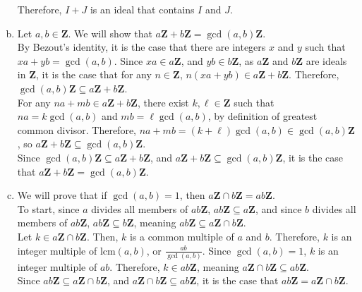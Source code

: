 \documentclass[10pt]{extarticle}
\begin{document}
\begin{enumerate}[(a)]
      Therefore, $I+J$ is an ideal that contains $I$ and $J$.
    \item Let $a,b\in\mathbf{Z}$. We will show that $a\mathbf{Z} + b\mathbf{Z} = \gcd(a,b)\mathbf{Z}$.\\

      By Bezout's identity, it is the case that there are integers $x$ and $y$ such that $xa + yb = \gcd(a,b)$. Since $xa\in a\mathbf{Z}$, and $yb\in b\mathbf{Z}$, as $a\mathbf{Z}$ and $b\mathbf{Z}$ are ideals in $\mathbf{Z}$, it is the case that for any $n\in\mathbf{Z}$, $n(xa + yb) \in a\mathbf{Z} + b\mathbf{Z}$. Therefore, $\gcd(a,b)\mathbf{Z}\subseteq a\mathbf{Z} + b\mathbf{Z}$.\\

      For any $na + mb\in a\mathbf{Z} + b\mathbf{Z}$, there exist $k,\ell\in \mathbf{Z}$ such that $na = k\gcd(a,b)$ and $mb = \ell\gcd(a,b)$, by definition of greatest common divisor. Therefore, $na + mb = (k+\ell)\gcd(a,b)\in \gcd(a,b)\mathbf{Z}$, so $a\mathbf{Z}+b\mathbf{Z}\subseteq \gcd(a,b)\mathbf{Z}$.\\

      Since $\gcd(a,b)\mathbf{Z}\subseteq a\mathbf{Z} + b\mathbf{Z}$, and $a\mathbf{Z} + b\mathbf{Z}\subseteq \gcd(a,b)\mathbf{Z}$, it is the case that $a\mathbf{Z} + b\mathbf{Z} = \gcd(a,b)\mathbf{Z}$.
    \item We will prove that if $\gcd(a,b) = 1$, then $a\mathbf{Z}\cap b\mathbf{Z} = ab\mathbf{Z}$.\\

      To start, since $a$ divides all members of $ab\mathbf{Z}$, $ab\mathbf{Z}\subseteq a\mathbf{Z}$, and since $b$ divides all members of $ab\mathbf{Z}$, $ab\mathbf{Z}\subseteq b\mathbf{Z}$, meaning $ab\mathbf{Z}\subseteq a\mathbf{Z}\cap b\mathbf{Z}$.\\

      Let $k\in a\mathbf{Z} \cap b\mathbf{Z}$. Then, $k$ is a common multiple of $a$ and $b$. Therefore, $k$ is an integer multiple of $\text{lcm}(a,b)$, or $\frac{ab}{\gcd(a,b)}$. Since $\gcd(a,b) = 1$, $k$ is an integer multiple of $ab$. Therefore, $k\in ab\mathbf{Z}$, meaning $a\mathbf{Z}\cap b\mathbf{Z}\subseteq ab\mathbf{Z}$.\\

      Since $ab\mathbf{Z}\subseteq a\mathbf{Z}\cap b\mathbf{Z}$, and $a\mathbf{Z}\cap b\mathbf{Z} \subseteq ab\mathbf{Z}$, it is the case that $ab\mathbf{Z} = a\mathbf{Z} \cap b\mathbf{Z}$.
  \end{enumerate}
\end{document}
